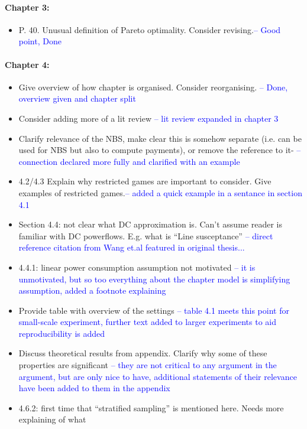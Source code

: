 \documentclass{article}
\begin{document}
\paragraph{Chapter 3:}\begin{itemize}
\item	P. 40. Unusual definition of Pareto optimality. Consider revising.\textcolor{blue}{-- Good point, Done}
\end{itemize}
\paragraph{Chapter 4:}\begin{itemize}
\item	Give overview of how chapter is organised. Consider reorganising. \textcolor{blue}{-- Done, overview given and chapter split}
\item	Consider adding more of a lit review \textcolor{blue}{-- lit review expanded in chapter 3}
\item	Clarify relevance of the NBS, make clear this is somehow separate (i.e. can be used for NBS
but also to compute payments), or remove the reference to it- \textcolor{blue}{-- connection declared more fully and clarified with an example}
\item	4.2/4.3 Explain why restricted games are important to consider. Give examples of restricted
games.\textcolor{blue}{-- added a quick example in a sentance in section 4.1}
\item	Section 4.4: not clear what DC approximation is. Can’t assume reader is familiar with DC
powerflows. E.g. what is “Line susceptance” \textcolor{blue}{-- direct reference citation from Wang et.al featured in original thesis...}
\item	4.4.1: linear power consumption assumption not motivated \textcolor{blue}{-- it is unmotivated, but so too everything about the chapter model is simplifying assumption, added a footnote explaining}
\item	Provide table with overview of the settings \textcolor{blue}{-- table 4.1 meets this point for small-scale experiment, further text added to larger experiments to aid reproducibility is added}
\item	Discuss theoretical results from appendix. Clarify why some of these properties are
significant \textcolor{blue}{-- they are not critical to any argument in the argument, but are only nice to have, additional statements of their relevance have been added to them in the appendix}
\item	4.6.2: first time that “stratified sampling” is mentioned here. Needs more explaining of what

\end{itemize}
\end{document}

